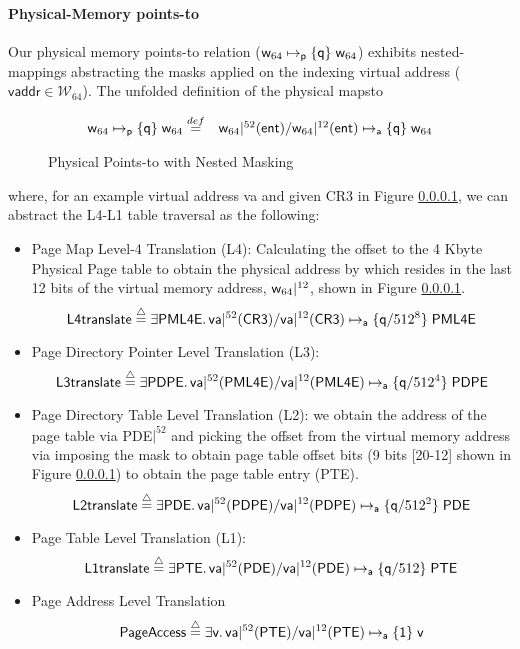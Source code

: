 \paragraph{Physical-Memory points-to} Our physical memory points-to relation ($\mathsf{w}_{64}\mapsto_{\mathsf{p}}\{\mathsf{q}\}\;\mathsf{w}_{64}$) exhibits nested-mappings abstracting the  masks applied on the indexing virtual address ($\textsf{vaddr}\in\mathcal{W}_{64}$). The unfolded definition of the physical mapsto 
\begin{figure}[!ht]
\[
\begin{array}{cl}
\mathsf{w}_{64}\mapsto_{\mathsf{p}}\{\mathsf{q}\}\;\mathsf{w}_{64} \stackrel{def}{=} & \mathsf{w}_{64}|^{52}(\textsf{ent}) / \mathsf{w}_{64}|^{12}(\textsf{ent}) \mapsto_{\mathsf{a}}\{\mathsf{q}\}\;\mathsf{w}_{64}
\end{array}
\]
\caption{Physical Points-to with Nested Masking}
  \label{fig:physicalpointsto}
\end{figure}
where, for an example virtual address \textsf{va} and given \textsf{CR3} in Figure \ref{}, we can abstract the L4-L1 table traversal as the following:
\begin{itemize}
  \item Page Map Level-4 Translation (L4): Calculating the offset to the 4 \textsf{Kbyte Physical Page} table to obtain the  physical address by  which resides in the last 12 bits of the virtual memory address, $\mathsf{w}_{64}|^{12}$,  shown in Figure \ref{}.
    \[ \textsf{L4translate} \stackrel{\triangle}{=} \exists \textsf{PML4E} \ldotp \mathsf{va}|^{52}(\textsf{CR3}) / \mathsf{va}|^{12}(\textsf{CR3}) \mapsto_{\mathsf{a}}\{\mathsf{q}/512^{8}\}\;\textsf{PML4E} \]
  \item Page Directory Pointer Level Translation (L3):
    \[ \textsf{L3translate} \stackrel{\triangle}{=} \exists \textsf{PDPE} \ldotp \mathsf{va}|^{52}(\textsf{PML4E}) / \mathsf{va}|^{12}(\textsf{PML4E}) \mapsto_{\mathsf{a}}\{\mathsf{q}/512^{4}\}\;\textsf{PDPE} \]
  \item Page Directory Table Level Translation (L2):  we obtain the address of the page table via \textsf{PDE}$|^{52}$ and picking the offset from the virtual memory address via imposing the mask to obtain page table offset bits (9 bits [20-12] shown in Figure \ref{}) to obtain the page table entry (\textsf{PTE}).
    \[ \textsf{L2translate} \stackrel{\triangle}{=} \exists \textsf{PDE} \ldotp \mathsf{va}|^{52}(\textsf{PDPE}) / \mathsf{va}|^{12}(\textsf{PDPE}) \mapsto_{\mathsf{a}}\{\mathsf{q}/512^{2}\}\;\textsf{PDE} \]
  \item Page Table Level Translation (L1):
    \[ \textsf{L1translate}  \stackrel{\triangle}{=} \exists \textsf{PTE} \ldotp \mathsf{va}|^{52}(\textsf{PDE}) / \mathsf{va}|^{12}(\textsf{PDE}) \mapsto_{\mathsf{a}}\{\mathsf{q}/512\}\;\textsf{PTE} \]
  \item Page Address Level Translation
    \[ \textsf{PageAccess} \stackrel{\triangle}{=} \exists \textsf{v} \ldotp \mathsf{va}|^{52}(\textsf{PTE}) / \mathsf{va}|^{12}(\textsf{PTE}) \mapsto_{\mathsf{a}}\{\mathsf{1}\}\;\textsf{v} \]
    
\end{itemize}
